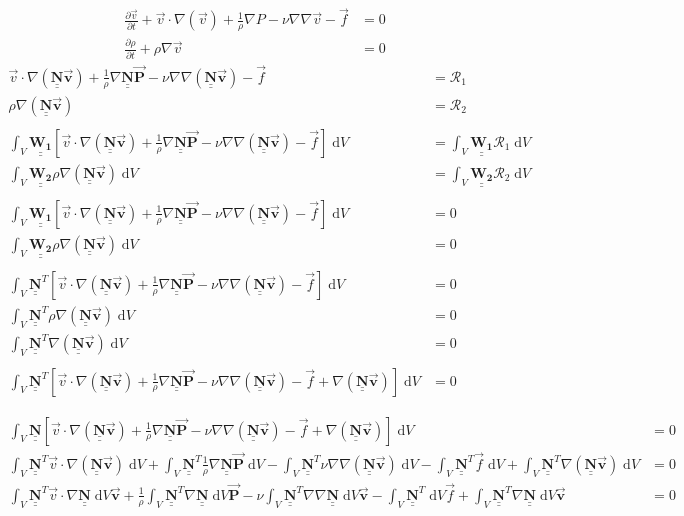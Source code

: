 \documentclass[12pt]{article}
\def\doubleunderline#1{\underline{\underline{#1}}}
\def\diffp[#1]#2{\frac{\partial#1}{\partial#2}}
\def\mt#1{\underline{\underline{\mathbf{#1}}}}
\def\d#1{\; \mathrm{d}#1}
\newcommand{\vv}{\vec{v}}
\newcommand{\vf}{\vec{f}}
\newcommand{\Pb}{\vec{\mathbf{P}}}
\newcommand{\vb}{\vec{\mathbf{v}}}
\newcommand{\nb}{\doubleunderline{\mathbf{N}}}
\begin{document}
\begin{align*}
	\diffp[\vv]{t} + \vv \cdot \nabla (\vv) + \frac{1}{\rho} \nabla P - \nu \nabla \nabla \vv - \vf &= 0 \\
	\diffp[\rho]{t} + \rho \nabla \vv &= 0
\end{align*}
\begin{align*}
	\vv \cdot \nabla (\nb \vb) + \frac{1}{\rho} \nabla \nb \Pb - \nu \nabla \nabla (\nb \vb)  -\vf &= \mathcal{R}_1 \\
	\rho \nabla (\nb \vb) &= \mathcal{R}_2 \\
	\\
	\int_{V} \mt{W_1} \left[ \vv \cdot \nabla (\nb \vb) + \frac{1}{\rho} \nabla \nb \Pb - \nu \nabla \nabla (\nb \vb) - \vf \right] \d{V} &= \int_{V} \mt{W_1} \mathcal{R}_1 \d{V} \\
	\int_{V} \mt{W_2} \rho \nabla (\nb \vb) \d{V} &= \int_{V} \mt{W_2} \mathcal{R}_2 \d{V} \\
	\\
	\int_{V} \mt{W_1} \left[ \vv \cdot \nabla (\nb \vb) + \frac{1}{\rho} \nabla \nb \Pb - \nu \nabla \nabla (\nb \vb) - \vf \right] \d{V} &= 0 \\
	\int_{V} \mt{W_2} \rho \nabla (\nb \vb) \d{V} &= 0 \\
	\\
	\int_{V} \nb^{T} \left[ \vv \cdot \nabla (\nb \vb) + \frac{1}{\rho} \nabla \nb \Pb - \nu \nabla \nabla (\nb \vb) - \vf \right] \d{V} &= 0 \\
	\int_{V} \nb^{T} \rho \nabla (\nb \vb) \d{V} &= 0 \\
	\int_{V} \nb^{T} \nabla (\nb \vb) \d{V} &= 0 \\
	\\
	\int_{V} \nb^{T} \left[ \vv \cdot \nabla (\nb \vb) + \frac{1}{\rho} \nabla \nb \Pb - \nu \nabla \nabla (\nb \vb) - \vf + \nabla (\nb \vb) \right] \d{V} &= 0
\end{align*}

\begin{align*}
	\int_{V} \nb \left[ \vv \cdot \nabla (\nb \vb) + \frac{1}{\rho} \nabla \nb \Pb - \nu \nabla \nabla (\nb \vb) - \vf + \nabla (\nb \vb) \right] \d{V} &= 0 \\
	\int_{V} \nb^{T} \vv \cdot \nabla (\nb \vb) \d{V} +  \int_{V} \nb^{T} \frac{1}{\rho} \nabla \nb \Pb \d{V} - \int_{V} \nb^{T} \nu \nabla \nabla (\nb \vb) \d{V} - \int_{V} \nb^{T} \vf \d{V} + \int_{V} \nb^{T} \nabla (\nb \vb) \d{V} &= 0 \\
	\int_{V} \nb^{T} \vv \cdot \nabla \nb \d{V} \vb +  \frac{1}{\rho} \int_{V} \nb^{T} \nabla \nb \d{V} \Pb - \nu \int_{V} \nb^{T}\nabla \nabla \nb \d{V} \vb - \int_{V} \nb^{T} \d{V} \vf + \int_{V} \nb^{T} \nabla \nb \d{V} \vb &= 0 \\
\end{align*}
\end{document}
